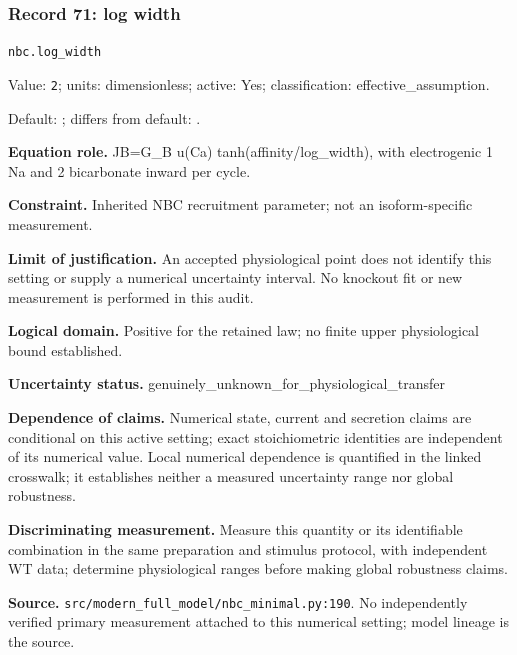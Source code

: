 \subsubsection*{Record 71: log width}
{\small \nolinkurl{nbc.log_width}\par

Value: \texttt{2}; units: dimensionless; active: Yes; classification: effective\_assumption.\par

Default: ; differs from default: .\par

\textbf{Equation role.} JB=G\_B u(Ca) tanh(affinity/log\_width), with electrogenic 1 Na and 2 bicarbonate inward per cycle.\par

\textbf{Constraint.} Inherited NBC recruitment parameter; not an isoform-specific measurement.\par

\textbf{Limit of justification.} An accepted physiological point does not identify this setting or supply a numerical uncertainty interval. No knockout fit or new measurement is performed in this audit.\par

\textbf{Logical domain.} Positive for the retained law; no finite upper physiological bound established.\par

\textbf{Uncertainty status.} genuinely\_unknown\_for\_physiological\_transfer\par

\textbf{Dependence of claims.} Numerical state, current and secretion claims are conditional on this active setting; exact stoichiometric identities are independent of its numerical value. Local numerical dependence is quantified in the linked crosswalk; it establishes neither a measured uncertainty range nor global robustness.\par

\textbf{Discriminating measurement.} Measure this quantity or its identifiable combination in the same preparation and stimulus protocol, with independent WT data; determine physiological ranges before making global robustness claims.\par

\textbf{Source.} \nolinkurl{src/modern_full_model/nbc_minimal.py:190}. No independently verified primary measurement attached to this numerical setting; model lineage is the source.\par}

